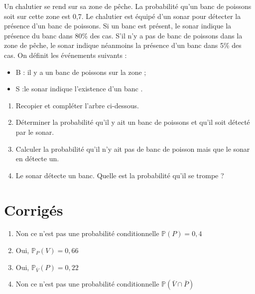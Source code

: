 \documentclass[french]{book}
\begin{document}
\begin{exocor}
Un chalutier se rend sur sa zone de pêche. La probabilité qu’un banc de poissons soit sur cette zone est 0,7. Le chalutier est équipé d’un sonar pour détecter la présence d’un banc de poissons. Si un banc est présent, le sonar indique la présence du banc dans 80\% des cas. S’il n’y a pas de banc de poissons dans la zone de pêche, le sonar indique néanmoins la présence d’un banc dans 5\% des cas. On définit les événements suivants :

\begin{itemize}
\item B : \og il y a un banc de poissons sur la zone \fg{};
\item S :\og le sonar indique l’existence d’un banc \fg{}.
\end{itemize}

\begin{enumerate}
\item Recopier et compléter l’arbre ci-dessous.
\item Déterminer la probabilité qu’il y ait un banc de poissons et qu’il soit détecté par le sonar.
\item Calculer la probabilité qu’il n’y ait pas de banc de poisson mais que le sonar en détecte un.
\item Le sonar détecte un banc. Quelle est la probabilité qu’il se trompe ?
\end{enumerate}

\begin{center}
\end{center}
\end{exocor}

\newpage
\section{Corrigés}
\begin{corrige}
\begin{enumerate}
\item Non ce n'est pas une probabilité conditionnelle  $\mathbb{P}(P)=0,4$
\item Oui, $\mathbb{P}_P(V)=0,66$
\item Oui, $\mathbb{P}_{\bar{V}}(P)=0,22$
\item Non ce n'est pas une probabilité conditionnelle $\mathbb{P}(\bar{V}\cap\bar{P})$
\end{enumerate}
\end{corrige}
\end{document}
